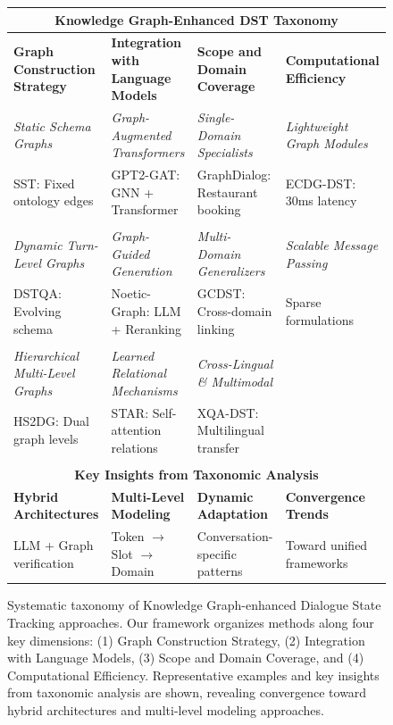 
\begin{figure}[t]
\centering
\begin{tabular}{|p{3.5cm}|p{3.5cm}|p{3.5cm}|p{3.5cm}|}
\hline
\multicolumn{4}{|c|}{\textbf{\Large Knowledge Graph-Enhanced DST Taxonomy}} \\
\hline
\hline
\textbf{Graph Construction Strategy} & \textbf{Integration with Language Models} & \textbf{Scope and Domain Coverage} & \textbf{Computational Efficiency} \\
\hline
\hline
\textit{Static Schema Graphs} & \textit{Graph-Augmented Transformers} & \textit{Single-Domain Specialists} & \textit{Lightweight Graph Modules} \\
\small{SST: Fixed ontology edges} & \small{GPT2-GAT: GNN + Transformer} & \small{GraphDialog: Restaurant booking} & \small{ECDG-DST: 30ms latency} \\
& & & \\
\hline
\textit{Dynamic Turn-Level Graphs} & \textit{Graph-Guided Generation} & \textit{Multi-Domain Generalizers} & \textit{Scalable Message Passing} \\
\small{DSTQA: Evolving schema} & \small{Noetic-Graph: LLM + Reranking} & \small{GCDST: Cross-domain linking} & \small{Sparse formulations} \\
& & & \\
\hline
\textit{Hierarchical Multi-Level Graphs} & \textit{Learned Relational Mechanisms} & \textit{Cross-Lingual \& Multimodal} & \\
\small{HS2DG: Dual graph levels} & \small{STAR: Self-attention relations} & \small{XQA-DST: Multilingual transfer} & \\
& & & \\
\hline
\hline
\multicolumn{4}{|c|}{\textbf{Key Insights from Taxonomic Analysis}} \\
\hline
\textbf{Hybrid Architectures} & \textbf{Multi-Level Modeling} & \textbf{Dynamic Adaptation} & \textbf{Convergence Trends} \\
LLM + Graph verification & Token $\rightarrow$ Slot $\rightarrow$ Domain & Conversation-specific patterns & Toward unified frameworks \\
\hline
\end{tabular}
\caption{Systematic taxonomy of Knowledge Graph-enhanced Dialogue State Tracking approaches. Our framework organizes methods along four key dimensions: (1) Graph Construction Strategy, (2) Integration with Language Models, (3) Scope and Domain Coverage, and (4) Computational Efficiency. Representative examples and key insights from taxonomic analysis are shown, revealing convergence toward hybrid architectures and multi-level modeling approaches.}
\label{fig:taxonomy}
\end{figure}
